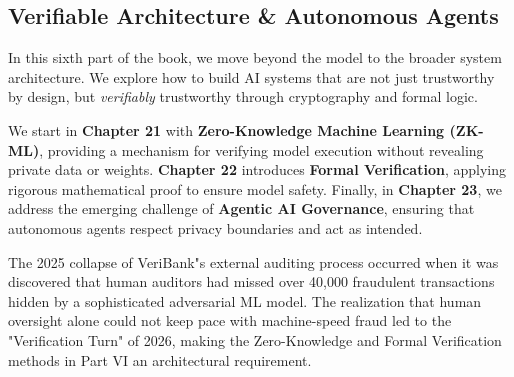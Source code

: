 % 
%

\begin{partbacktext}
\part{Verifiable Architecture \& Autonomous Agents}
\noindent In this sixth part of the book, we move beyond the model to the broader system architecture. We explore how to build AI systems that are not just trustworthy by design, but \textit{verifiably} trustworthy through cryptography and formal logic.

We start in \textbf{Chapter 21} with \textbf{Zero-Knowledge Machine Learning (ZK-ML)}, providing a mechanism for verifying model execution without revealing private data or weights. \textbf{Chapter 22} introduces \textbf{Formal Verification}, applying rigorous mathematical proof to ensure model safety. Finally, in \textbf{Chapter 23}, we address the emerging challenge of \textbf{Agentic AI Governance}, ensuring that autonomous agents respect privacy boundaries and act as intended.

\begin{casestudy} 
The 2025 collapse of VeriBank"s external auditing process occurred when it was discovered that human auditors had missed over 40,000 fraudulent transactions hidden by a sophisticated adversarial ML model. The realization that human oversight alone could not keep pace with machine-speed fraud led to the "Verification Turn" of 2026, making the Zero-Knowledge and Formal Verification methods in Part VI an architectural requirement. 
\end{casestudy} 
\end{partbacktext}
